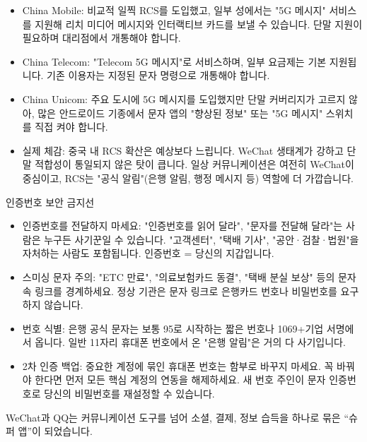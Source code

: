 
\begin{itemize}
  \item China Mobile: 비교적 일찍 RCS를 도입했고, 일부 성에서는 "5G 메시지" 서비스를 지원해 리치 미디어 메시지와 인터랙티브 카드를 보낼 수 있습니다. 단말 지원이 필요하며 대리점에서 개통해야 합니다.
  \item China Telecom: "Telecom 5G 메시지"로 서비스하며, 일부 요금제는 기본 지원됩니다. 기존 이용자는 지정된 문자 명령으로 개통해야 합니다.
  \item China Unicom: 주요 도시에 5G 메시지를 도입했지만 단말 커버리지가 고르지 않아, 많은 안드로이드 기종에서 문자 앱의 "향상된 정보" 또는 "5G 메시지" 스위치를 직접 켜야 합니다.
  \item 실제 체감: 중국 내 RCS 확산은 예상보다 느립니다. WeChat 생태계가 강하고 단말 적합성이 통일되지 않은 탓이 큽니다. 일상 커뮤니케이션은 여전히 WeChat이 중심이고, RCS는 "공식 알림"(은행 알림, 행정 메시지 등) 역할에 더 가깝습니다.
\end{itemize}

\begin{tcbwarn}{인증번호 보안 금지선}
\begin{itemize}
  \item 인증번호를 전달하지 마세요: "인증번호를 읽어 달라", "문자를 전달해 달라"는 사람은 누구든 사기꾼일 수 있습니다. "고객센터", "택배 기사", "공안·검찰·법원"을 자처하는 사람도 포함됩니다. 인증번호 = 당신의 지갑입니다.
  \item 스미싱 문자 주의: "ETC 만료", "의료보험카드 동결", "택배 분실 보상" 등의 문자 속 링크를 경계하세요. 정상 기관은 문자 링크로 은행카드 번호나 비밀번호를 요구하지 않습니다.
  \item 번호 식별: 은행 공식 문자는 보통 95로 시작하는 짧은 번호나 1069+기업 서명에서 옵니다. 일반 11자리 휴대폰 번호에서 온 "은행 알림"은 거의 다 사기입니다.
  \item 2차 인증 백업: 중요한 계정에 묶인 휴대폰 번호는 함부로 바꾸지 마세요. 꼭 바꿔야 한다면 먼저 모든 핵심 계정의 연동을 해제하세요. 새 번호 주인이 문자 인증번호로 당신의 비밀번호를 재설정할 수 있습니다.
\end{itemize}

\end{tcbwarn}


WeChat과 QQ는 커뮤니케이션 도구를 넘어 소셜, 결제, 정보 습득을 하나로 묶은 “슈퍼 앱”이 되었습니다.

